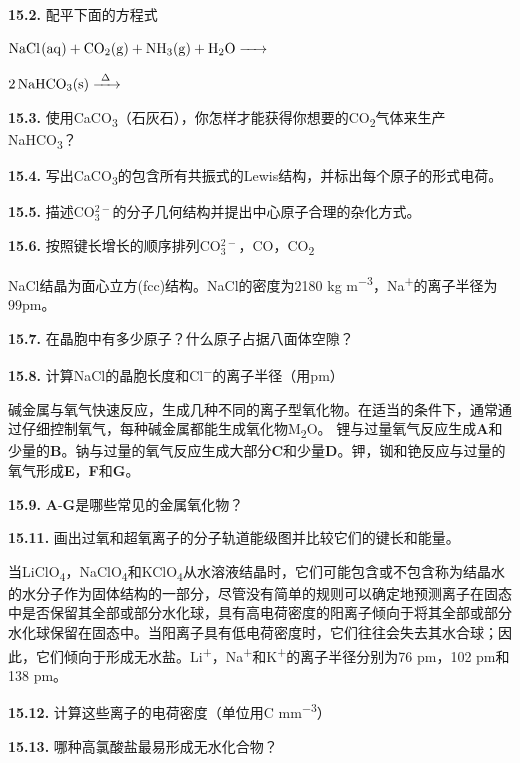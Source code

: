 \noindent\textbf{15.2.} 配平下面的方程式

$\ce{NaCl(aq) + CO2(g) + NH3(g) + H2O ->}$

$\ce{2NaHCO3(s) ->[\Delta]}$

\noindent\textbf{15.3.}
使用CaCO\textsubscript{3}（石灰石），你怎样才能获得你想要的CO\textsubscript{2}气体来生产NaHCO\textsubscript{3}？

\noindent\textbf{15.4.}
写出CaCO\textsubscript{3}的包含所有共振式的Lewis结构，并标出每个原子的形式电荷。

\noindent\textbf{15.5.}
描述CO$_3^{2-}$的分子几何结构并提出中心原子合理的杂化方式。

\noindent\textbf{15.6.}
按照键长增长的顺序排列CO$_3^{2-}$，CO，CO\textsubscript{2}

NaCl结晶为面心立方(fcc)结构。NaCl的密度为2180
kg m\textsuperscript{−3}，Na\textsuperscript{+}的离子半径为99pm。

\noindent\textbf{15.7.} 在晶胞中有多少原子？什么原子占据八面体空隙？

\noindent\textbf{15.8.}
计算NaCl的晶胞长度和Cl\textsuperscript{−}的离子半径（用pm）

碱金属与氧气快速反应，生成几种不同的离子型氧化物。在适当的条件下，通常通过仔细控制氧气，每种碱金属都能生成氧化物M\textsubscript{2}O。
锂与过量氧气反应生成\textbf{A}和少量的\textbf{B}。钠与过量的氧气反应生成大部分\textbf{C}和少量\textbf{D}。钾，铷和铯反应与过量的氧气形成\textbf{E}，\textbf{F}和\textbf{G}。

\noindent\textbf{15.9.} \textbf{A}-\textbf{G}是哪些常见的金属氧化物？

\noindent\textbf{15.11.} 画出过氧和超氧离子的分子轨道能级图并比较它们的键长和能量。

当LiClO\textsubscript{4}，NaClO\textsubscript{4}和KClO\textsubscript{4}从水溶液结晶时，它们可能包含或不包含称为结晶水的水分子作为固体结构的一部分，尽管没有简单的规则可以确定地预测离子在固态中是否保留其全部或部分水化球，具有高电荷密度的阳离子倾向于将其全部或部分水化球保留在固态中。当阳离子具有低电荷密度时，它们往往会失去其水合球；因此，它们倾向于形成无水盐。Li\textsuperscript{+}，Na\textsuperscript{+}和K\textsuperscript{+}的离子半径分别为76 pm，102 pm和138 pm。

\noindent\textbf{15.12.} 计算这些离子的电荷密度（单位用C mm\textsuperscript{−3}）

\noindent\textbf{15.13.} 哪种高氯酸盐最易形成无水化合物？
